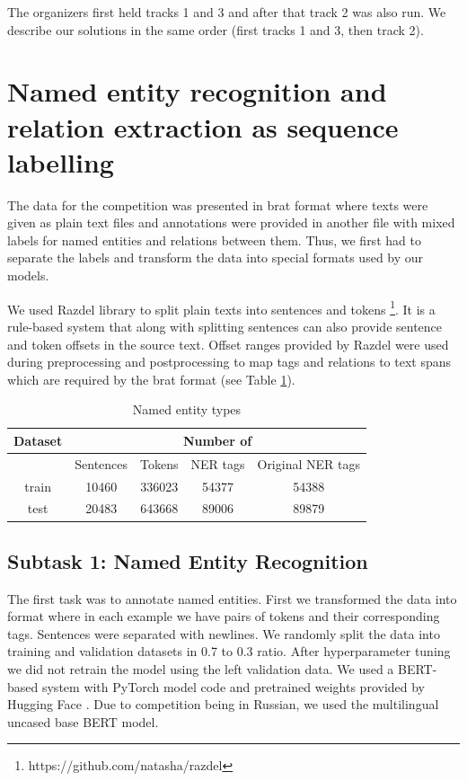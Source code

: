 \documentclass{dialogue}
\begin{document}
	The organizers first held tracks 1 and 3 and after that track 2 was also run. We describe our solutions in the same order (first tracks 1 and 3, then track 2).
	\section{Named entity recognition and relation extraction as sequence labelling}
	The data for the competition was presented in brat format \cite{brat} where texts were given as plain text files and annotations were provided in another file with mixed labels for named entities and relations between them. Thus, we first had to separate the labels and transform the data into special formats used by our models.
	
	We used Razdel library to split plain texts into sentences and tokens \footnote{https://github.com/natasha/razdel}. It is a rule-based system that along with splitting sentences can also provide sentence and token offsets in the source text. Offset ranges provided by Razdel were used during preprocessing and postprocessing to map tags and relations to text spans which are required by the brat format (see Table \ref{tab:tokenization}).
	
	\begin{table}[bth]
		\centering
		\begin{tabular}{c|c|c|c|c}
			\hline
			\multicolumn{1}{c|}{Dataset} &
			\multicolumn{4}{c}{Number of} \\  \hline
			& Sentences& Tokens & NER tags & Original NER tags\\ \hline
			train & 10460 & 336023 & 54377 & 54388\\ \hline
			test & 20483 & 643668 & 89006 & 89879\\ \hline
		\end{tabular}
		\caption{Named entity types}
		\label{tab:tokenization}
	\end{table}
	
	\subsection{Subtask 1: Named Entity Recognition}
	The first task was to annotate named entities. First we transformed the data into format where in each example we have pairs of tokens and their corresponding tags. Sentences were separated with newlines. We randomly split the data into training and validation datasets in 0.7 to 0.3 ratio. After hyperparameter tuning we did not retrain the model using the left validation data. We used a BERT-based system \cite{bert} with PyTorch model code and pretrained weights provided by Hugging Face \cite{Wolf2019HuggingFacesTS}. Due to competition being in Russian, we used the multilingual uncased base BERT model.
	
\end{document}
